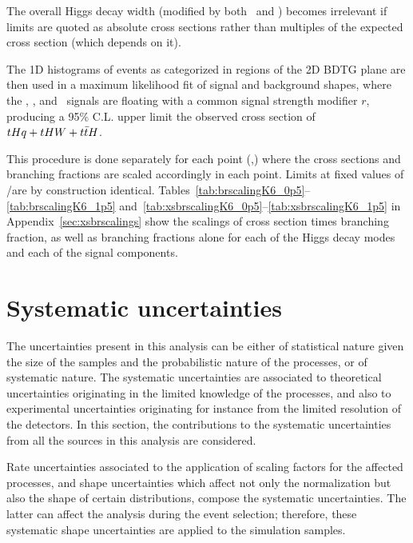 The overall Higgs decay width (modified by both \Ct\ and \CV) becomes irrelevant if limits are quoted as absolute cross sections rather than multiples of the expected cross section (which depends on it).


The 1D histograms of events as categorized in regions of the 2D BDTG plane are then used in a maximum likelihood fit of signal and background shapes, where the \tHq, \tHW, and \ttH\ signals are floating with a common signal strength modifier $r$, producing a 95\% C.L. upper limit the observed cross section of $tHq+tHW+t\bar{t}H$.

This procedure is done separately for each point  (\Ct,\CV) where the cross sections and branching fractions are scaled accordingly in each point. Limits at fixed values of \Ct/\CV are by construction identical.
Tables~\ref{tab:brscalingK6_0p5}--\ref{tab:brscalingK6_1p5} and~\ref{tab:xsbrscalingK6_0p5}--\ref{tab:xsbrscalingK6_1p5} in Appendix~\ref{sec:xsbrscalings} show the scalings of cross section times branching fraction, as well as branching fractions alone for each of the Higgs decay modes and each of the signal components. 


\section{Systematic uncertainties}

The uncertainties present in this analysis can be either of statistical nature given the size of the samples and the probabilistic nature of the processes, or of systematic nature. The systematic uncertainties are associated to theoretical uncertainties originating in the limited knowledge of the processes, and also to experimental uncertainties originating for instance from the limited resolution of the detectors. In this section, the contributions to the systematic uncertainties from all the sources in this analysis are considered.

Rate uncertainties associated to the application of scaling factors for the affected processes, and shape uncertainties which affect not only the normalization but also the shape of certain distributions, compose the systematic uncertainties. The latter can affect the analysis during the event selection; therefore, these systematic shape uncertainties are applied to the simulation samples.

